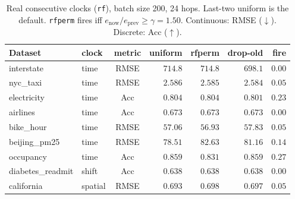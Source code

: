 
\begin{table}[ht]\centering
\caption{Real consecutive clocks (\texttt{rf}), batch size 200,
24 hops. Last-two uniform is the default. \texttt{rfperm} fires
iff $e_{\mathrm{now}}/e_{\mathrm{prev}}\ge\gamma=1.50$.
Continuous: RMSE ($\downarrow$). Discrete: Acc ($\uparrow$).}
\label{tab:po-refit-real-rf}
\small
\setlength{\tabcolsep}{3.5pt}
\begin{tabular}{@{}llcrrrr@{}}\toprule
Dataset & clock & metric & uniform & rfperm & drop-old & fire \\
\midrule
interstate & time & RMSE & $714.8$ & $714.8$ & $\mathbf{698.1}$ & $0.00$ \\
nyc\_taxi & time & RMSE & $2.586$ & $2.585$ & $\mathbf{2.584}$ & $0.05$ \\
electricity & time & Acc & $\mathbf{0.804}$ & $\mathbf{0.804}$ & $0.801$ & $0.23$ \\
airlines & time & Acc & $\mathbf{0.673}$ & $\mathbf{0.673}$ & $\mathbf{0.673}$ & $0.00$ \\
bike\_hour & time & RMSE & $57.06$ & $\mathbf{56.93}$ & $57.83$ & $0.05$ \\
beijing\_pm25 & time & RMSE & $\mathbf{78.51}$ & $82.63$ & $81.16$ & $0.14$ \\
occupancy & time & Acc & $\mathbf{0.859}$ & $0.831$ & $\mathbf{0.859}$ & $0.27$ \\
diabetes\_readmit & shift & Acc & $\mathbf{0.638}$ & $\mathbf{0.638}$ & $\mathbf{0.638}$ & $0.00$ \\
california & spatial & RMSE & $\mathbf{0.693}$ & $0.698$ & $0.697$ & $0.05$ \\
\bottomrule
\end{tabular}
\end{table}

